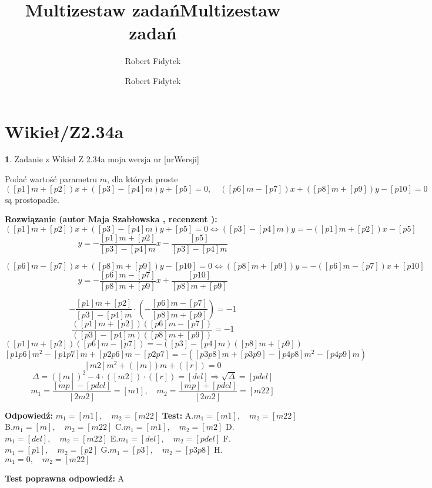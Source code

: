 \documentclass[12pt, a4paper]{article}
\title{Multizestaw zadań}
\author{Robert Fidytek}
\date{}\documentclass[12pt, a4paper]{article}
\title{Multizestaw zadań}
\author{Robert Fidytek}
\date{}
\theoremstyle{definition} %
\newtheorem{zad}{}
\theoremstyle{definition} %
\newtheorem{zad}{}
\newcommand{\kategoria}[1]{\section{#1}} %
\newcommand{\zadStart}[1]{\begin{zad}#1\newline} %
\newcommand{\zadStop}{\end{zad}}   %
\newcommand{\rozwStart}[2]{\noindent \textbf{Rozwiązanie (autor #1 , recenzent #2): }\newline} %
\newcommand{\rozwStop}{\newline}                                            %
\newcommand{\odpStart}{\noindent \textbf{Odpowiedź:}\newline}    %
\newcommand{\odpStop}{\newline}                                             %
\newcommand{\testStart}{\noindent \textbf{Test:}\newline} %
\newcommand{\testStop}{\newline} %
\newcommand{\kluczStart}{\noindent \textbf{Test poprawna odpowiedź:}\newline} %
\newcommand{\kluczStop}{\newline} %
\begin{document}
\maketitle


\kategoria{Wikieł/Z2.34a}
\zadStart{Zadanie z Wikieł Z 2.34a  moja wersja nr [nrWersji]}

Podać wartość parametru $m$, dla których proste 
$$([p1]m+[p2])x+([p3]-[p4]m)y+[p5]=0, \quad ([p6]m-[p7])x+([p8]m+[p9])y-[p10]=0 $$są prostopadłe.
\zadStop

\rozwStart{Maja Szabłowska}{}
$$([p1]m+[p2])x+([p3]-[p4]m)y+[p5]=0 \iff ([p3]-[p4]m)y=-([p1]m+[p2])x-[p5]$$
$$y=-\frac{[p1]m+[p2]}{[p3]-[p4]m}x-\frac{[p5]}{[p3]-[p4]m}$$

$$([p6]m-[p7])x+([p8]m+[p9])y-[p10]=0 \iff ([p8]m+[p9])y=-([p6]m-[p7])x+[p10]$$
$$y=-\frac{[p6]m-[p7]}{[p8]m+[p9]}x+\frac{[p10]}{[p8]m+[p9]}$$

$$-\frac{[p1]m+[p2]}{[p3]-[p4]m}\cdot\left(-\frac{[p6]m-[p7]}{[p8]m+[p9]}\right)=-1$$ 
$$\frac{([p1]m+[p2])([p6]m-[p7])}{([p3]-[p4]m)([p8]m+[p9])}=-1$$
$$([p1]m+[p2])([p6]m-[p7])=-([p3]-[p4]m)([p8]m+[p9])$$
$$[p1p6]m^{2}-[p1p7]m+[p2p6]m-[p2p7]=-([p3p8]m+[p3p9]-[p4p8]m^{2}-[p4p9]m)$$
$$[m2]m^{2}+([m])m+([r])=0$$
$$\Delta=([m])^{2}-4\cdot([m2])\cdot([r])=[del] \Rightarrow \sqrt{\Delta}=[pdel]$$
$$m_{1}=\frac{[mp]-[pdel]}{[2m2]}=[m1], \quad m_{2}=\frac{[mp]+[pdel]}{[2m2]}=[m22]$$
\rozwStop


\odpStart
$m_{1}=[m1], \quad m_{2}=[m22]$
\odpStop
\testStart
A.$m_{1}=[m1], \quad m_{2}=[m22]$
B.$m_{1}=[m], \quad m_{2}=[m22]$
C.$m_{1}=[m1], \quad m_{2}=[m2]$
D.$m_{1}=[del], \quad m_{2}=[m22]$
E.$m_{1}=[del], \quad m_{2}=[pdel]$
F.$m_{1}=[p1], \quad m_{2}=[p2]$
G.$m_{1}=[p3], \quad m_{2}=[p3p8]$
H.$m_{1}=0, \quad m_{2}=[m22]$

\testStop
\kluczStart
A
\kluczStop
\end{document}
